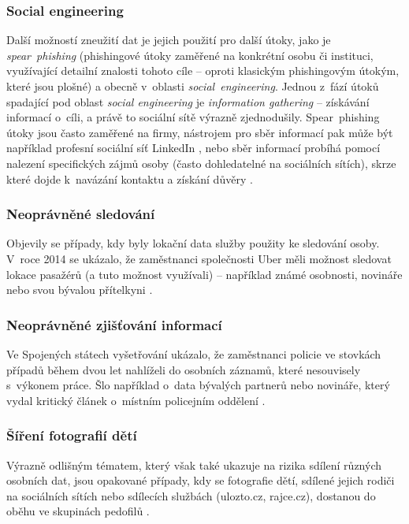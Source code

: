 \subsubsection*{Social engineering}
Další možností zneužití dat je jejich použití pro další útoky, jako je \textit{spear~phishing} (phishingové útoky zaměřené na konkrétní osobu či instituci, využívající detailní znalosti tohoto cíle -- oproti klasickým phishingovým útokým, které jsou plošné) a obecně v~oblasti \textit{social~engineering}. Jednou z~fází  útoků spadající pod oblast \textit{social engineering} je \textit{information gathering} -- získávání informací o~cíli, a právě to sociální sítě výrazně zjednodušily. Spear~phishing útoky jsou často zaměřené na firmy, nástrojem pro sběr informací pak může být například profesní sociální síť LinkedIn \citep{social-engineering-tools}, nebo sběr informací probíhá pomocí nalezení specifických zájmů osoby (často dohledatelné na sociálních sítích), skrze které dojde k~navázání kontaktu a získání důvěry \citep{social-engineering-book}.

\subsubsection*{Neoprávněné sledování}
Objevily se případy, kdy byly lokační data služby použity ke sledování osoby. V~roce 2014 se ukázalo, že zaměstnanci společnosti Uber měli možnost sledovat lokace pasažérů (a tuto možnost využívali) -- například známé osobnosti, novináře nebo svou bývalou přítelkyni \citep{uber-spying}.

\subsubsection*{Neoprávněné zjišťování informací}
Ve Spojených státech vyšetřování ukázalo, že zaměstnanci policie ve stovkách případů během dvou let nahlíželi do osobních záznamů, které nesouvisely s~výkonem práce. Šlo například o~data bývalých partnerů nebo novináře, který vydal kritický článek o~místním policejním oddělení \citep{police-spying}. 

\subsubsection*{Šíření fotografií dětí}
Výrazně odlišným tématem, který však také ukazuje na rizika sdílení různých osobních dat, jsou opakované případy, kdy se fotografie dětí, sdílené jejich rodiči na sociálních sítích nebo sdílecích službách (ulozto.cz, rajce.cz), dostanou do oběhu ve skupinách pedofilů \citep{pedophiles-web}.

